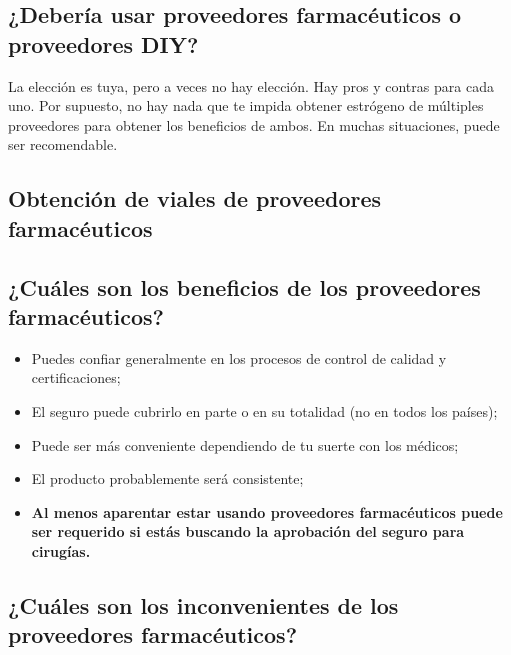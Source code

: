 \documentclass{article}
\begin{document}
\subsection{¿Debería usar proveedores farmacéuticos o proveedores DIY?}

La elección es tuya, pero a veces no hay elección. Hay pros y contras para cada uno. Por supuesto, no hay nada que te impida obtener estrógeno de múltiples proveedores para obtener los beneficios de ambos. En muchas situaciones, puede ser recomendable.

\subsection*{Obtención de viales de proveedores farmacéuticos}

\subsection{¿Cuáles son los beneficios de los proveedores farmacéuticos?}

\begin{itemize}
  \item Puedes confiar generalmente en los procesos de control de calidad y certificaciones;
  \item El seguro puede cubrirlo en parte o en su totalidad (no en todos los países);
  \item Puede ser más conveniente dependiendo de tu suerte con los médicos;
  \item El producto probablemente será consistente;
  \item \textbf{Al menos aparentar estar usando proveedores farmacéuticos puede ser requerido si estás buscando la aprobación del seguro para cirugías.}
\end{itemize}

\subsection{¿Cuáles son los inconvenientes de los proveedores farmacéuticos?}
\end{document}
